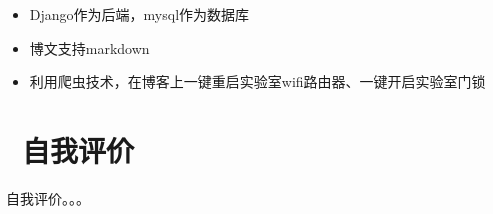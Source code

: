 \documentclass{resume}
\begin{document}
\begin{itemize}
\item Django作为后端，mysql作为数据库
\item 博文支持markdown
\item 利用爬虫技术，在博客上一键重启实验室wifi路由器、一键开启实验室门锁
\end{itemize}


\section{\faPaperPlane\ 自我评价}
\hspace*{0.8cm}自我评价。。。



%
%
\end{document}

